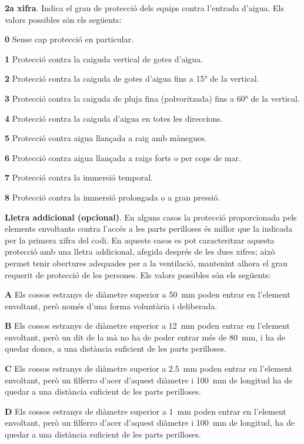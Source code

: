 \textbf{2a xifra}. Indica el grau de protecció dels equips contra
l'entrada d'aigua. Els valors possibles són els següents:
\begin{list}{}
   {\setlength{\labelwidth}{10mm} \setlength{\leftmargin}{10mm} \setlength{\labelsep}{2mm}}
   \item[\textbf{0}] Sense cap protecció en particular.
   \item[\textbf{1}] Protecció contra la caiguda vertical de gotes d'aigua.
   \item[\textbf{2}] Protecció contra la caiguda de gotes d'aigua fins a \ang{15} de la  vertical.
   \item[\textbf{3}] Protecció contra la caiguda de pluja fina (polvoritzada) fins a \ang{60} de la  vertical.
   \item[\textbf{4}] Protecció contra la caiguda d'aigua en totes les direccions.
   \item[\textbf{5}] Protecció contra aigua llançada a raig amb mànegues.
   \item[\textbf{6}] Protecció contra aigua llançada a raigs forts o per cops de mar.
   \item[\textbf{7}] Protecció contra la immersió temporal.
   \item[\textbf{8}] Protecció contra la immersió prolongada o a gran pressió.
\end{list}


\textbf{Lletra addicional (opcional)}. En alguns casos la protecció
proporcionada pels elements envoltants contra l'accés a les parts
perilloses és millor que la indicada per la primera xifra del codi.
En aquests casos es pot caracteritzar aquesta protecció amb una
lletra addicional, afegida després de les dues xifres; això permet
tenir obertures adequades per a la ventilació,  mantenint alhora el
grau requerit de protecció de les persones. Els valors possibles són
els següents:
\begin{list}{}
   {\setlength{\labelwidth}{10mm} \setlength{\leftmargin}{10mm} \setlength{\labelsep}{2mm}}
   \item[\textbf{A}] Els  cossos estranys de diàmetre superior a
   \qty{50}{mm}    poden entrar en l'element envoltant, però només d'una forma voluntària i deliberada.
   \item[\textbf{B}] Els  cossos estranys de diàmetre superior a \qty{12}{mm}
    poden entrar en l'element envoltant, però un dit de la mà no ha de poder entrar més de \qty{80}{mm}, i
    ha de quedar doncs, a una distància    suficient de les parts perilloses.
   \item[\textbf{C}] Els  cossos estranys de diàmetre superior a \qty{2,5}{mm}
   poden entrar en l'element envoltant, però un filferro d'acer d'aquest diàmetre i \qty{100}{mm}
   de longitud ha de quedar a una distància suficient de les parts perilloses.
   \item[\textbf{D}] Els  cossos estranys de diàmetre superior a \qty{1}{mm}
   poden entrar en l'element envoltant, però un filferro d'acer d'aquest diàmetre i \qty{100}{mm}
   de longitud, ha de quedar a una distància suficient de les parts perilloses.
\end{list}

